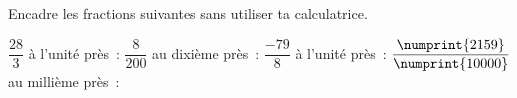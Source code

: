 %
%
Encadre les fractions suivantes sans utiliser ta calculatrice.
  \begin{tasks}
    \task $\dfrac{28}{3}$ à l'unité près~:
    \task $\dfrac{8}{200}$ au dixième près~:
    \task $\dfrac{- 79}{8}$ à l'unité près~:
    \task $\dfrac{\numprint{2159}}{\numprint{10000}}$ au millième près~:
  \end{tasks}
